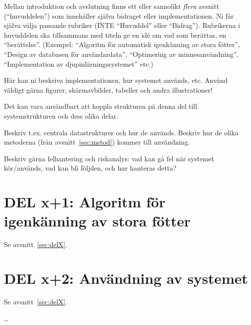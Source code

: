 \label{sec:delX}
Mellan introduktion och avslutning finns ett eller sannolikt \emph{flera} avsnitt (``huvuddelen'') som innehåller själva bidraget eller implementationen.
Ni får själva välja passande rubriker (INTE ``Huvuddel'' eller ``Bidrag'').  Rubrikerna i huvuddelen ska tillsammans med titeln ge en idé om vad som berättas, en ``berättelse''. (Exempel: ``Algoritm för automatisk igenkänning av stora fötter'', ``Design av databasen för användardata'', ``Optimering av minnesanvändning'', ``Implementation av djup\-in\-lär\-nings\-sys\-te\-met'' etc.)

Här kan ni beskriva implementationen, hur systemet används, etc. Använd väldigt gärna figurer, skärmavbilder, tabeller och andra illustrationer!

Det kan vara användbart att koppla strukturen på denna del till systemstrukturen och dess olika delar.

Beskriv t.ex. centrala datastrukturer och hur de används. Beskriv hur de olika metoderna (från avsnitt~\ref{sec:metod}) kommer till användning.

Beskriv gärna felhantering och riskanalys: vad kan gå fel när systemet kör/används, vad kan bli följden, och hur hanteras detta?

\section{DEL x+1: Algoritm för igenkänning av stora fötter}
Se avsnitt~\ref{sec:delX}.
\section{DEL x+2: Användning av systemet}
Se avsnitt~\ref{sec:delX}.


\ldots

